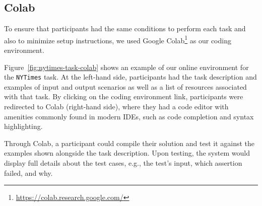 







\subsection{Colab}
\label{cp6:environment}


To ensure that participants had the same conditions to perform each task
and also to minimize setup instructions, we used Google Colab\footnote{\url{https://colab.research.google.com/}} as our coding environment. 



Figure~\ref{fig:nytimes-task-colab} shows an example of our online environment for the \texttt{NYTimes} task.
At the left-hand side, participants had the task description and examples of input and output scenarios as well as a list of resources associated with that task. 
By clicking on the coding environment link, participants were redirected to Colab (right-hand side),
where they had a code editor with amenities commonly found in modern IDEs, such as code completion and syntax highlighting. 



Through Colab, a participant could compile their solution and test it against the examples shown alongside the task description.
Upon testing, the system would display full details about the test cases, e.g., the test's input, which assertion failed, and why. 




